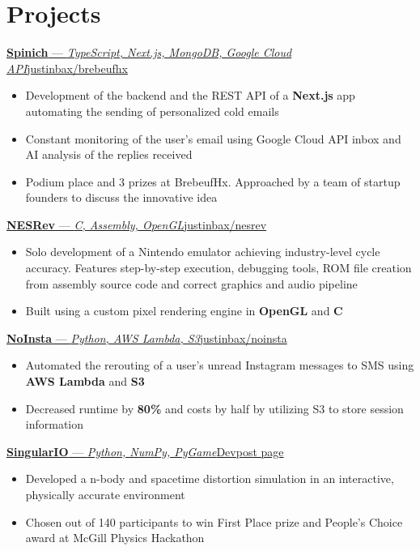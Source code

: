\documentclass{article}
\newcommand{\shortlinkrole}[4]{
    {\href{#3}{\normalfont\textbf{#1} --- \textit{#2}\hfill#4\:\faExternalLink}\vspace*{-4pt}}
}
\newenvironment{bulletpoints}{\begin{itemize}\setlength\itemsep{-0.2em}}{\end{itemize}}
\begin{document}
\section*{Projects}

\shortlinkrole{Spinich}{TypeScript, Next.js, MongoDB, Google Cloud API}{https://github.com/justinbax/brebeufhx}{justinbax/brebeufhx}
\begin{bulletpoints}
    \item Development of the backend and the REST API of a \textbf{Next.js} app automating the sending of personalized cold emails
    \item Constant monitoring of the user's email using Google Cloud API inbox and AI analysis of the replies received
    \item Podium place and 3 prizes at BrebeufHx. Approached by a team of startup founders to discuss the innovative idea
\end{bulletpoints}

\shortlinkrole{NESRev}{C, Assembly, OpenGL}{https://github.com/justinbax/nesrev}{justinbax/nesrev}
\begin{bulletpoints}
    \item Solo development of a Nintendo emulator achieving industry-level cycle accuracy. Features step-by-step execution, debugging tools, ROM file creation from assembly source code and correct graphics and audio pipeline
    \item Built using a custom pixel rendering engine in \textbf{OpenGL} and \textbf{C}
\end{bulletpoints}

\shortlinkrole{NoInsta}{Python, AWS Lambda, S3}{https://github.com/justinbax/brebeufhx}{justinbax/noinsta}
\begin{bulletpoints}
    \item Automated the rerouting of a user's unread Instagram messages to SMS using \textbf{AWS Lambda} and \textbf{S3}
    \item Decreased runtime by \textbf{80\%} and costs by half by utilizing S3 to store session information
\end{bulletpoints}

\shortlinkrole{SingularIO}{Python, NumPy, PyGame}{https://devpost.com/software/singulario}{Devpost page}
\begin{bulletpoints}
    \item Developed a n-body and spacetime distortion simulation in an interactive, physically accurate environment
    \item Chosen out of 140 participants to win First Place prize and People's Choice award at McGill Physics Hackathon
\end{bulletpoints}
\end{document}
